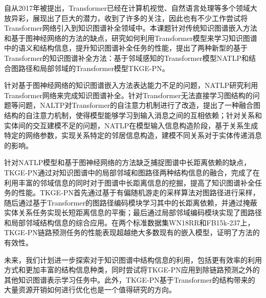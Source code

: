 \summary
自从2017年被提出，Transformer已经在计算机视觉、自然语言处理等多个领域大放异彩，展现出了巨大的潜力，收到了许多的关注，因此也有不少工作尝试将Transformer网络引入到知识图谱补全领域中。本课题针对传统知识图谱嵌入方法和基于图神经网络的方法的缺点，研究如何利用Transformer模型来学习知识图谱中的语义和结构信息，提升知识图谱补全任务的性能，提出了两种新型的基于Transformer的知识图谱补全方法：基于邻域感知的Transformer模型NATLP和结合图路径和局部邻域的Transformer模型TKGE-PN。

针对基于图神经网络的知识图谱嵌入方法表达能力不足的问题，NATLP研究利用Transformer网络来完成知识图谱补全。针对Transformer无法直接学习图结构的问题等问题，NALTP对Transformer的自注意力机制进行了改造，提出了一种融合图结构的自注意力机制，使得模型能够学习到输入消息之间的互相依赖；针对关系和实体间的交互建模不足的问题，NATLP在模型输入信息构造阶段，基于关系生成特定的网络参数，实现关系特定的邻居信息构造，建模不同关系对于实体传递消息的影响。

针对NATLP模型和基于图神经网络的方法缺乏捕捉图谱中长距离依赖的缺点，TKGE-PN通过对知识图谱中的局部邻域和图路径两种结构信息的融合，完成了在利用丰富的邻域信息的同时对于图谱中长距离信息的挖掘，提高了知识图谱补全任务的性能。TKGE-PN首先通过基于有偏随机游走的采样算法对图路径进行采样，随后通过基于Transformer的图路径编码模块学习其中的长距离依赖，并通过掩蔽实体关系任务实现长短距离信息的平衡；最后通过局部邻域编码模块实现了图路径和局部邻域结构信息的综合应用。在两个标准数据集WN18RR和FB15k-237上，TKGE-PN链路预测任务的性能表现超越绝大多数现有的嵌入模型，证明了方法的有效性。

未来，我们计划进一步探索对于知识图谱中结构信息的利用，包括更有效率的利用方式和更加丰富的结构信息种类，同时尝试将TKGE-PN应用到除链路预测之外的其他知识图谱表示学习任务中。此外，TKGE-PN基于Transformer的结构带来的大量资源开销如何进行优化也是一个值得研究的方向。

